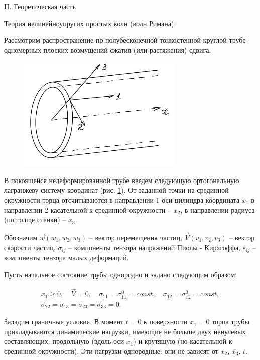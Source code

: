 \documentclass[specialist, subf, href, colorlinks=true, 14pt, final]{disser}
\theoremstyle{definition}
\newcommand{\npart}[2]{\noindent #1. \underline{#2}}
\begin{document}
\npart{II}{Теоретическая часть}

Теория нелинейноупругих простых волн (волн Римана)

Рассмотрим распространение по полубесконечной тонкостенной круглой трубе одномерных плоских возмущений сжатия (или растяжения)-сдвига.

\begin{figure} 
  \includegraphics[width=80mm]{pics/2-3-1.png}
  \caption{}
  \label{2-3-1}
\end{figure}
В покоящейся недеформированной трубе введем  следующую ортогональную лагранжеву систему координат (рис. \ref{2-3-1}). От заданной точки на срединной окружности торца отсчитываются в направлении 1 оси цилиндра координата $x_1$ в направлении 2 касательной к срединной окружности -- $x_2$, в направлении радиуса (по толще стенки) -- $x_3$.

Обозначим $\overrightarrow{w} (w_{1}, w_{2}, w_{3})$ -- вектор перемещения частиц, $\overrightarrow{V} (v_{1}, v_{2}, v_{3})$ -- вектор скорости частиц, $\sigma_{ij}$ -- компоненты тензора напряжений Пиолы - Кирхгоффа, $\varepsilon_{ij}$ -- компоненты тензора малых деформаций.

Пусть начальное состояние трубы однородно и задано следующим образом:
\addtocounter{equation}{1}
\begin{equation}\label{eq:231}
	\begin{array}{l}
		x_1 \geqslant 0, \quad  \overrightarrow{V} = 0, \quad \sigma_{11} = \sigma_{11}^0 = const, \quad \sigma_{12} = \sigma_{12}^0 = const, \\ \sigma_{22} = \sigma_{13} = \sigma_{23} = \sigma_{33} = 0.
	
	\end{array}
  \tag{1}
\end{equation}

Зададим граничные условия. В момент $t=0$ к поверхности $x_{1}=0$ торца трубы прикладываются динамические нагрузки, имеющие не больше двух ненулевых составляющих: продольную (вдоль оси $x_1$) и крутящую (но касательной к срединной окружности). Эти нагрузки однородные: они не зависят от $x_2$, $x_3$, $t$.
\end{document}
